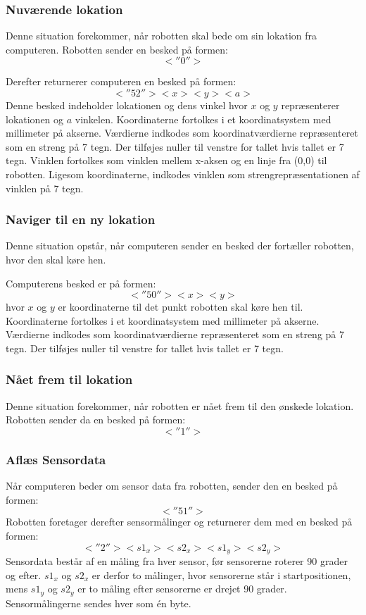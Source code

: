 \subsubsection{Nuværende lokation}\label{protokol:positur}
Denne situation forekommer, når robotten skal bede om sin lokation fra computeren.
Robotten sender en besked på formen:
\[
< \! ''0'' \! >
\]


Derefter returnerer computeren en besked på formen:
\[< \! ''52'' \!><x><y><a>\]
Denne besked indeholder lokationen og dens vinkel hvor $x$ og $y$ repræsenterer lokationen og $a$ vinkelen.
Koordinaterne fortolkes i et koordinatsystem med millimeter på akserne.
Værdierne indkodes som koordinatværdierne repræsenteret som en streng på 7 tegn.
Der tilføjes nuller til venstre for tallet hvis tallet er 7 tegn.
Vinklen fortolkes som vinklen mellem x-aksen og en linje fra (0,0) til robotten.
Ligesom koordinaterne, indkodes vinklen som strengrepræsentationen af vinklen på 7 tegn.

\subsubsection{Naviger til en ny lokation}\label{design:protokol_navigertilny}
Denne situation opstår, når computeren sender en besked der fortæller robotten, hvor den skal køre hen.

Computerens besked er på formen:
 \[<\! ''50'' \!><x><y>\] 
hvor $x$ og $y$ er koordinaterne til det punkt robotten skal køre hen til.
Koordinaterne fortolkes i et koordinatsystem med millimeter på akserne.
Værdierne indkodes som koordinatværdierne repræsenteret som en streng på 7 tegn.
Der tilføjes nuller til venstre for tallet hvis tallet er 7 tegn.

\subsubsection{Nået frem til lokation}
Denne situation forekommer, når robotten er nået frem til den ønskede lokation.
Robotten sender da en besked på formen: \[<\!''1''\!>\]

\subsubsection{Aflæs Sensordata}
Når computeren beder om sensor data fra robotten, sender den en besked på formen: \[<\!''51''\!>\]
Robotten foretager derefter sensormålinger og returnerer dem med en besked på formen:
\[<\!''2''\!><s1_x> <s2_x> <s1_y> <s2_y>\]
Sensordata består af en måling fra hver sensor, før sensorerne roterer 90 grader og efter.
$ s1_x $ og $ s2_x $ er derfor to målinger, hvor sensorerne står i startpositionen, mens $ s1_y $ og $ s2_y $ er to måling efter sensorerne er drejet 90 grader.
Sensormålingerne sendes hver som én byte.

